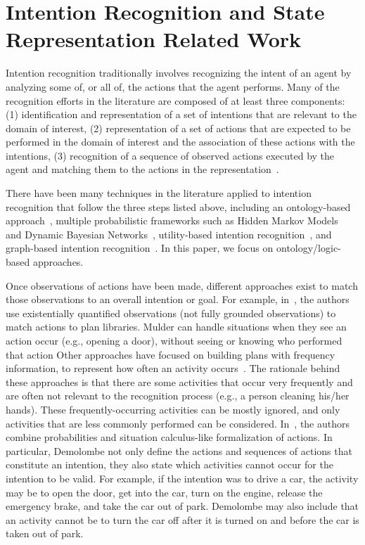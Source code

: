 \documentclass[final,1p,times]{elsarticle}
\begin{document}
\section{Intention Recognition and State Representation Related Work }\label{S:section1}
Intention recognition traditionally involves recognizing the intent of an agent by analyzing some of, or all of, the actions that the agent performs. Many of the recognition efforts in the literature are composed of at least three components: (1) identification and representation of a set of intentions that are relevant to the domain of interest, (2) representation of a set of actions that are expected to be performed in the domain of interest and the association of these actions with the intentions, (3) recognition of a sequence of observed actions executed by the agent and matching them to the actions in the representation~\cite{SADRI.2011}.


There have been many techniques in the literature applied to intention recognition that follow the three steps listed above, including an ontology-based approach~\cite{JEON.ICMUE.2008}, multiple probabilistic frameworks such as  Hidden Markov Models~\cite{KELLEY.ICHRI.2008} and Dynamic Bayesian Networks~\cite{SCHREMPF.ICAR.2005}, utility-based intention recognition~\cite{MAO.AAMAS.2004}, and graph-based intention recognition~\cite{YOUN.IJASET.2008}. In this paper, we focus on ontology/logic-based approaches.


Once observations of actions have been made, different approaches exist to match those observations to an overall intention or goal. For example, in~\cite{MULDER.IF.2003}, the authors use existentially quantified observations (not fully grounded observations) to match actions to plan libraries. Mulder can handle situations when they see an action occur (e.g., opening a door), without seeing or knowing who performed that action Other approaches have focused on building plans with frequency information, to represent how often an activity occurs~\cite{JARVIS.AIM.2005}. The rationale behind these approaches is that there are some activities that occur very frequently and are often not relevant to the recognition process (e.g., a person cleaning his/her hands). These frequently-occurring activities can be mostly ignored, and only activities that are less commonly performed can be considered. In~\cite{DEMOLOMBE.CLIMA.2005}, the authors combine probabilities and situation calculus-like formalization of actions. In particular, Demolombe not only define the actions and sequences of actions that constitute an intention, they also state which activities cannot occur for the intention to be valid. For example, if the intention was to drive a car, the activity may be to open the door, get into the car, turn on the engine, release the emergency brake, and take the car out of park. Demolombe may also include that an activity cannot be to turn the car off after it is turned on and before the car is taken out of park.
\end{document}
